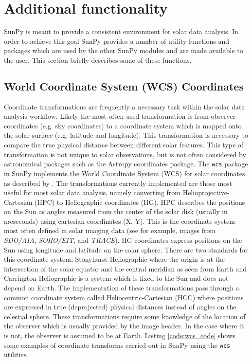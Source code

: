 \section{Additional functionality}\label{sec:util}
SunPy is meant to provide a consistent environment for solar data analysis. In 
order to achieve this goal SunPy provides a number of utility functions and packages which 
are used by the other SunPy modules and are made available to the user. This section 
briefly describes some of these functions.

	
\subsection{World Coordinate System (WCS) Coordinates}\label{ssec:util:wcs}
Coordinate transformations are frequently a necessary task within the solar 
data analysis workflow. Likely the most often used transformation is from 
observer coordinates (e.g. sky coordinates) to a coordinate system which is 
mapped onto the solar surface (e.g. latitude and longitude). This 
transformation is necessary to compare the true physical distance between 
different solar features. This type of transformation is not unique
to solar observations, but is not often considered by astronomical packages
such as the Astropy 
coordinates package. The \verb|wcs| package in SunPy implements the World Coordinate 
System (WCS) for solar coordinates as described by \cite{Thompson2000}. The 
transformations currently implemented are those most useful 
for most solar data analysis, namely converting from Helioprojective-Cartesian 
(HPC) to Heliographic coordinates (HG). HPC describes the positions on 
the Sun as angles measured from the center of the solar disk (usually in 
arcseconds) using cartesian coordinates (X, Y). This is the coordinate system 
most often defined in solar imaging data (see for example, images from 
\textit{SDO/AIA}, \textit{SOHO/EIT}, and \textit{TRACE}). 
HG coordinates express positions on the Sun using longitude and latitude on 
the solar sphere. There are two standards for this coordinate system, 
Stonyhurst-Heliographic where the origin is at the intersection of the solar 
equator and the central meridian as seen from Earth and 
Carrington-Heliographic is a system which is fixed to the Sun and does not depend on Earth. The 
implementation of these transformations pass through a common coordinate system 
called Heliocentric-Cartesian (HCC) where positions are expressed in true 
(deprojected) physical distances instead of angles on the celestial sphere.
These transformations require some knowledge of the location of the observer 
which is usually provided by the image header. In the case where it is 
not, the observer is assumed to be at Earth. Listing \ref{code:wcs_code} shows 
some examples of coordinate transforms carried out in SunPy using the 
\verb|wcs| utilities. 

